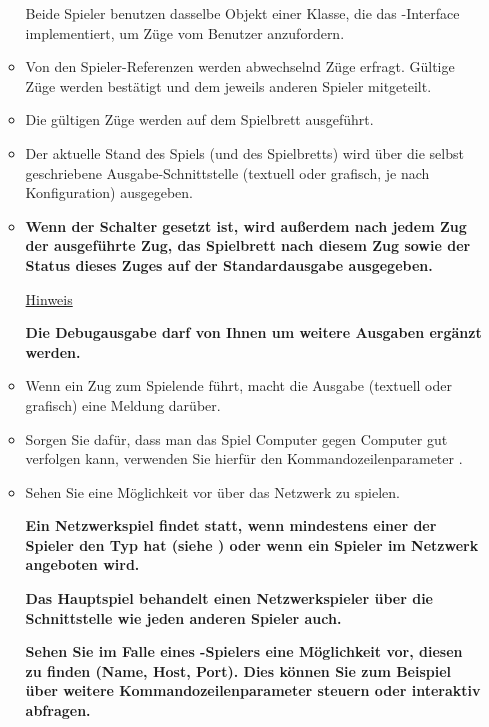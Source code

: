 \begin{enumerate}
\begin{itemize}
Beide Spieler benutzen dasselbe Objekt einer Klasse, die das -Interface implementiert, um Züge vom Benutzer anzufordern.
\item Von den Spieler-Referenzen werden abwechselnd Züge erfragt. Gültige Züge werden bestätigt und dem jeweils anderen Spieler mitgeteilt.
\item Die gültigen Züge werden auf dem Spielbrett ausgeführt.
\item Der aktuelle Stand des Spiels (und des Spielbretts) wird über die selbst geschriebene Ausgabe-Schnittstelle (textuell oder grafisch, je nach Konfiguration) ausgegeben.
\item \textbf{Wenn der Schalter  gesetzt ist, wird außerdem nach jedem Zug der ausgeführte Zug, das Spielbrett nach diesem Zug sowie der Status dieses Zuges auf der Standardausgabe ausgegeben.}

\underline{Hinweis}

\textbf{Die Debugausgabe darf von Ihnen um weitere Ausgaben ergänzt werden.} \marginpar{\textbf{|}}
\item Wenn ein Zug zum Spielende führt, macht die Ausgabe (textuell oder grafisch) eine Meldung darüber.
\item Sorgen Sie dafür, dass man das Spiel Computer gegen Computer gut verfolgen kann, verwenden Sie hierfür den Kommandozeilenparameter .
\item Sehen Sie eine Möglichkeit vor über das Netzwerk zu spielen.  \marginpar{\textbf{|}}

 \marginpar{\textbf{|}}

\textbf{Ein Netzwerkspiel findet statt, wenn mindestens einer der Spieler den Typ  hat (siehe ) oder wenn ein Spieler im Netzwerk angeboten wird.} \marginpar{\textbf{|}}

\textbf{Das Hauptspiel behandelt einen Netzwerkspieler über die Schnittstelle  wie jeden anderen Spieler auch.} \marginpar{\textbf{|}}

\textbf{Sehen Sie im Falle eines -Spielers eine Möglichkeit vor, diesen zu finden (Name, Host, Port). Dies können Sie zum Beispiel über weitere Kommandozeilenparameter steuern oder interaktiv abfragen.} \marginpar{\textbf{|}}


\end{itemize}
\end{enumerate}
